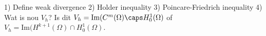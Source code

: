 \documentclass[thesis.tex]{subfiles}
\begin{document}
1) Define weak divergence
2) Holder inequality
3) Poincare-Friedrich inequality
4) Wat is nou $V_h$? Is dit $V_h = \text{Im}(C^m(\Omega) \caps H_0^1(\Omega)$ of $V_h = \text{Im}(H^{k+1}(\Omega)\cap H_0^1(\Omega)$.
\end{document}
